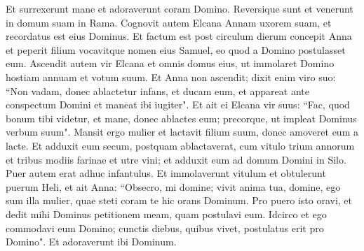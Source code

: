 \begin{biblechapter}
\verse Et surrexerunt mane et adoraverunt coram Domino. Reversique sunt et venerunt in domum suam in Rama. Cognovit autem Elcana Annam uxorem suam, et recordatus est eius Dominus. 
\verse Et factum est post circulum dierum concepit Anna et peperit filium vocavitque nomen eius Samuel, eo quod a Domino postulasset eum. 
\verse Ascendit autem vir Elcana et omnis domus eius, ut immolaret Domino hostiam annuam et votum suum. 
\verse Et Anna non ascendit; dixit enim viro suo: “Non vadam, donec ablactetur infans, et ducam eum, et appareat ante conspectum Domini et maneat ibi iugiter". 
\verse Et ait ei Elcana vir suus: “Fac, quod bonum tibi videtur, et mane, donec ablactes eum; precorque, ut impleat Dominus verbum suum". Mansit ergo mulier et lactavit filium suum, donec amoveret eum a lacte. 
\verse Et adduxit eum secum, postquam ablactaverat, cum vitulo trium annorum et tribus modiis farinae et utre vini; et adduxit eum ad domum Domini in Silo. Puer autem erat adhuc infantulus. 
\verse Et immolaverunt vitulum et obtulerunt puerum Heli, 
\verse et ait Anna: “Obsecro, mi domine; vivit anima tua, domine, ego sum illa mulier, quae steti coram te hic orans Dominum. 
\verse Pro puero isto oravi, et dedit mihi Dominus petitionem meam, quam postulavi eum. 
\verse Idcirco et ego commodavi eum Domino; cunctis diebus, quibus vivet, postulatus erit pro Domino". Et adoraverunt ibi Dominum. 
\end{biblechapter}

